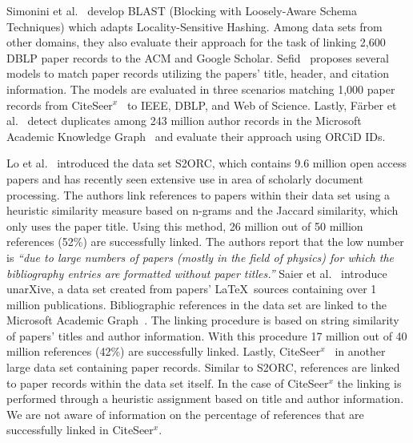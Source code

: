 Simonini et al.~\cite{Simonini2016blast} develop BLAST (Blocking with Loosely-Aware Schema Techniques) which adapts Locality-Sensitive Hashing. Among data sets from other domains, they also evaluate their approach for the task of linking 2,600 DBLP paper records to the ACM and Google Scholar. 
Sefid~\cite{Sefid2019} proposes several models to match paper records utilizing the papers' title, header, and citation information. The models are evaluated in three scenarios matching 1,000 paper records from CiteSeer$^x$~\cite{CiteSeerX2019} to IEEE, DBLP, and Web of Science.
Lastly, Färber et al.~\cite{FaerberLin2022} detect duplicates among 243 million author records in the Microsoft Academic Knowledge Graph~\cite{MAKG} and evaluate their approach using ORCiD IDs.

%
Lo et al.~\cite{Lo2020} introduced the data set S2ORC, which contains 9.6 million open access papers and has recently seen extensive use in area of scholarly document processing. The authors link references to papers within their data set using a heuristic similarity measure based on n-grams and the Jaccard similarity, which only uses the paper title. Using this method, 26 million out of 50 million references  (52\%) are successfully linked. The authors report that the low number is \textit{``due to large numbers of papers (mostly in the field of physics) for which the bibliography entries are formatted without paper titles.''} Saier et al.~\cite{Saier2020} introduce unarXive, a data set created from papers' \LaTeX\ sources containing over 1 million publications. Bibliographic references in the data set are linked to the Microsoft Academic Graph~\cite{Sinha2015,Wang2019}. The linking procedure is based on string similarity of papers' titles and author information. With this procedure 17 million out of 40 million references (42\%) are successfully linked.
Lastly, CiteSeer$^x$~\cite{Wu2015,CiteSeerX2019} in another large data set containing paper records. Similar to S2ORC, references are linked to paper records within the data set itself. In the case of CiteSeer$^x$ the linking is performed through a heuristic assignment based on title and author information.  We are not aware of information on the percentage of references that are successfully linked in CiteSeer$^x$.

